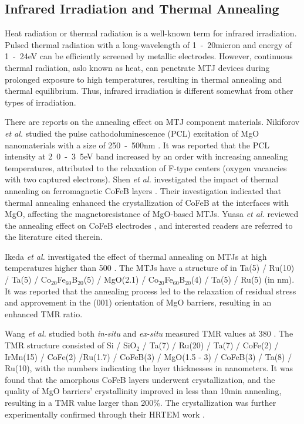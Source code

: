 \documentclass[molecules,review,submit,pdftex,moreauthors]{Definitions/mdpi}
\begin{document}
\subsection{Infrared Irradiation and Thermal Annealing}


Heat radiation or thermal radiation is a well-known term for infrared irradiation.  Pulsed thermal radiation with a long-wavelength of \unit{1 - 20}{micron} and energy of \unit{1 - 24}{eV} can be efficiently screened by metallic electrodes.  However, continuous thermal radiation, aslo known as heat, can penetrate MTJ devices during prolonged exposure to high temperatures, resulting in thermal annealing and thermal equilibrium.  Thus, infrared irradiation is different somewhat from other types of irradiation.


There are reports on the annealing effect on MTJ component materials. Nikiforov \textit{et al.} studied the pulse cathodoluminescence (PCL) excitation of MgO nanomaterials with a  size of \unit{250 - 500}{nm} \cite{Nikiforov2016RM}.  It was reported that the PCL intensity at \unit{2.0 - 3.5}{eV} band increased by an order with increasing annealing temperatures, attributed to the relaxation of F-type centers (oxygen vacancies with two captured electrons).  Shen \textit{et al.} investigated the impact of thermal annealing on ferromagnetic CoFeB layers \cite{Shen2006APL}.  Their investigation indicated that thermal annealing enhanced the crystallization of CoFeB at the interfaces with MgO, affecting the magnetoresistance of MgO-based MTJs.  Yuasa \textit{et al.} reviewed the annealing effect on CoFeB electrodes \cite{Yuasa2007JPd}, and interested readers are referred to the literature cited therein. 


Ikeda \textit{et al.} investigated the effect of thermal annealing on MTJs at high temperatures higher than \unit{500}{\celsius} \cite{Ikeda2008APL}.  The MTJs have a structure of  in Ta(5) / Ru(10) / Ta(5) / Co$_{20}$Fe$_{60}$B$_{20}$(5) / MgO(2.1) / Co$_{20}$Fe$_{60}$B$_{20}$(4) / Ta(5) / Ru(5) (in nm).  It was reported that the annealing process led to the relaxation of residual stress and approvement in the (001) orientation of MgO barriers, resulting in an enhanced TMR ratio.
 
 
Wang \textit{et al.} studied both \textit{in-situ} and \textit{ex-situ} measured TMR values at \unit{380}{\celsius} \cite{Wang2008APL1}.  The TMR structure consisted of Si / SiO$_2$ / Ta(7) / Ru(20) / Ta(7) / CoFe(2) / IrMn(15) / CoFe(2) /Ru(1.7) / CoFeB(3) / MgO(1.5 - 3) / CoFeB(3) / Ta(8) / Ru(10), with the numbers indicating the layer thicknesses in nanometers.  It was found that the amorphous CoFeB layers underwent crystallization, and the quality of MgO barriers' crystallinity improved in less than \unit{10}{min} annealing, resulting in a TMR value larger than \unit{200}{\%}.  The crystallization was further experimentally confirmed through their HRTEM work \cite{Wang2016NL}.  
\end{document}
